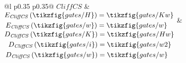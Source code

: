 \begin{table}[t]
\begin{tabular}{@{}l p{0.35\linewidth} p{0.35\linewidth}@{}}
$\mathit{CliffCS}$ &
\(
\begin{aligned}
E_{\mathit{CliffCS}}\left(\tikzfig{gates/H}\right) &= \tikzfig{gates/Kw}\\
E_{\mathit{CliffCS}}\left(\tikzfig{gates/w}\right) &= \tikzfig{gates/w}
\end{aligned}
\) &
\(
\begin{aligned}
D_{\mathit{CliffCS}}\left(\tikzfig{gates/K}\right) &= \tikzfig{gates/Hw}\\
D_{\mathit{CliffCS}}\left(\tikzfig{gates/i}\right) &= \tikzfig{gates/w2}\\
D_{\mathit{CliffCS}}\left(\tikzfig{gates/w}\right) &= \tikzfig{gates/w}
\end{aligned}
\) \\
\noalign{\vskip 0.7ex}
\hline

\end{tabular}

\caption{Encoding/decoding pairs used in the completeness-transfer arguments.
For the qutrit Clifford and Clifford+CS rows, the source presentation is the
scalar-refined one from \cref{lem:scalar-refinement}.
\emph{Convention:} omitted generators are fixed by $E_\bullet$ and $D_\bullet$.}
\label{tab:ED-clifford-family}
\end{table}

